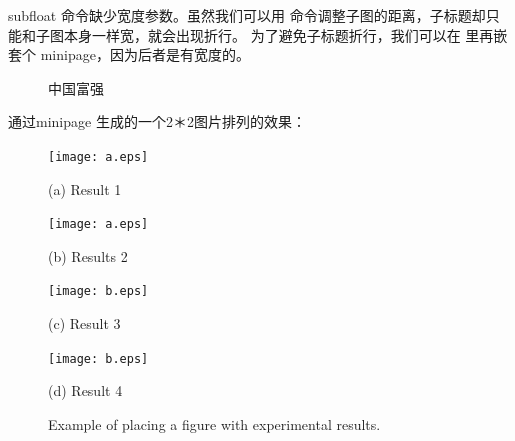 subfloat 命令缺少宽度参数。虽然我们可以用 \hspace 命令调整子图的距离，子标题却只能和子图本身一样宽，就会出现折行。
为了避免子标题折行，我们可以在 \subfloat 里再嵌套个 minipage，因为后者是有宽度的。
\begin{figure}[htbp]
	\centering
	\caption{中国富强}
\end{figure}


通过minipage  生成的一个2＊2图片排列的效果：
\begin{figure}
	\begin{minipage}{0.48\linewidth}
		\centerline{\texttt{[image: a.eps]}}
		\centerline{(a) Result 1}
	\end{minipage}
	\hfill
	\begin{minipage}{.48\linewidth}
		\centerline{\texttt{[image: a.eps]}}
		\centerline{(b) Results 2}
	\end{minipage}
	\vfill
	\begin{minipage}{0.48\linewidth}
		\centerline{\texttt{[image: b.eps]}}
		\centerline{(c) Result 3}
	\end{minipage}
	\hfill
	\begin{minipage}{0.48\linewidth}
		\centerline{\texttt{[image: b.eps]}}
		\centerline{(d) Result 4}
	\end{minipage}
	\caption{Example of placing a figure with experimental results.}
	\label{fig:res}
\end{figure}